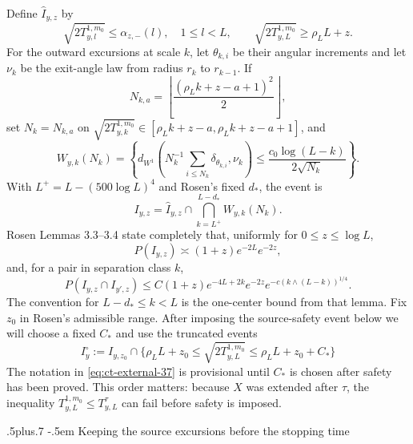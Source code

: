 \documentclass[12pt,reqno]{amsart}
\makeatletter
\def\subsubsection{\@startsection{subsubsection}{3}{0pt}%
  {.5\linespacing plus.7\linespacing}
  {-.5em}
  {\normalfont\itshape}}
\theoremstyle{plain}
\theoremstyle{definition}
\theoremstyle{remark}
\numberwithin{equation}{section}
\makeatother
\begin{document}
Define $\widehat I_{y,z}$ by
\begin{equation}
\sqrt{2T_{y,l}^{1,m_0}}\le\alpha_{z,-}(l),\quad1\le l<L,
 \qquad \sqrt{2T_{y,L}^{1,m_0}}\ge\rho_LL+z.\label{eq:ct-external-32}
\end{equation}
For the outward excursions at scale $k$, let $\theta_{k,i}$ be their
angular increments and let $\nu_k$ be the exit-angle law from radius
$r_k$ to $r_{k-1}$.  If
\[
N_{k,a}=\left\lfloor\frac{(\rho_Lk+z-a+1)^2}{2}\right\rfloor,
\]
 set $N_k=N_{k,a}$ on
$\sqrt{2T_{y,k}^{1,m_0}}\in[\rho_Lk+z-a,\rho_Lk+z-a+1]$, and
\begin{equation}
W_{y,k}(N_k)=\left\{
 d_{W^1}\left(N_k^{-1}\sum_{i\le N_k}\delta_{\theta_{k,i}},
                 \nu_k\right)
 \le\frac{c_0\log(L-k)}{2\sqrt{N_k}}\right\}.\label{eq:ct-external-33}
\end{equation}
With $L^+=L-(500\log L)^4$ and Rosen's fixed $d_*$, the event is
\begin{equation}
I_{y,z}=\widehat I_{y,z}
          \cap\bigcap_{k=L^+}^{L-d_*}W_{y,k}(N_k).\label{eq:ct-external-34}
\end{equation}
Rosen Lemmas 3.3--3.4 state completely that, uniformly for
$0\le z\le\log L$,
\begin{equation}
P(I_{y,z})\asymp(1+z)e^{-2L}e^{-2z},\label{eq:ct-external-35}
\end{equation}
and, for a pair in separation class $k$,
\begin{equation}
P(I_{y,z}\cap I_{y',z})
 \le C(1+z)e^{-4L+2k}e^{-2z}
       e^{-c(k\wedge(L-k))^{1/4}}.\label{eq:ct-external-36}
\end{equation}
The convention for $L-d_*\le k<L$ is the one-center bound from that
lemma.  Fix $z_0$ in Rosen's admissible range.  After imposing the
source-safety event below we will choose a fixed $C_*$ and use the
truncated events
\begin{equation}
I_{y}^{\circ}:=I_{y,z_0}\cap
 \{\rho_LL+z_0\le\sqrt{2T_{y,L}^{1,m_0}}
                         \le\rho_LL+z_0+C_*\}\label{eq:ct-external-37}
\end{equation}
The notation in \eqref{eq:ct-external-37} is provisional until $C_*$ is chosen after
safety has been proved.  This order matters: because $X$ was extended
after $\tau$, the inequality
$T_{y,L}^{1,m_0}\le T_{y,L}^{\tau}$ can fail before safety is imposed.

\subsubsection{Keeping the source excursions before the stopping time}
\end{document}
